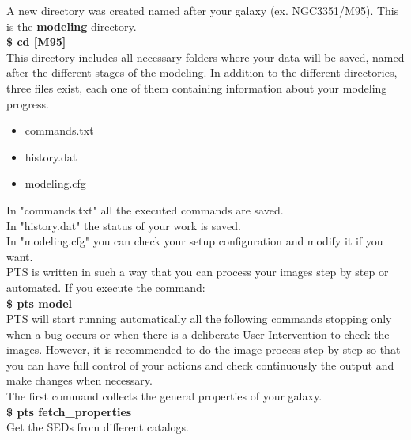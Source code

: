 \documentclass[15pt,a4paper,oneside,openright]{report}
\begin{document}
A new directory was created named after your galaxy (ex. NGC3351/M95). This is the \textbf{modeling} directory.\\

\textbf{\$ cd [M95]}\\

This directory includes all necessary folders where your data will be saved, named after the different stages of the modeling. 
In addition to the different directories, three files exist, each one of them containing information about your modeling progress.

\begin{itemize}
	\item commands.txt
	\item history.dat
	\item modeling.cfg
\end{itemize}
 
In "commands.txt" all the executed commands are saved.\\

In "history.dat" the status of your work is saved.\\  

In "modeling.cfg" you can check your setup configuration and modify it if you want.\\

PTS is written in such a way that you can process your images step by step or automated. If you execute the command:\\


\textbf{\$ pts model}\\

PTS will start running automatically all the following commands stopping only when a bug occurs or when there is a deliberate User Intervention
to check the images. However, it is recommended to do the image process step by step so that you can have full control of your
actions and check continuously the output and make changes when necessary.\\

The first command collects the general properties of your galaxy.\\

\textbf{\$ pts fetch\_properties}\\

Get the SEDs from different catalogs.\\ 
\end{document}
